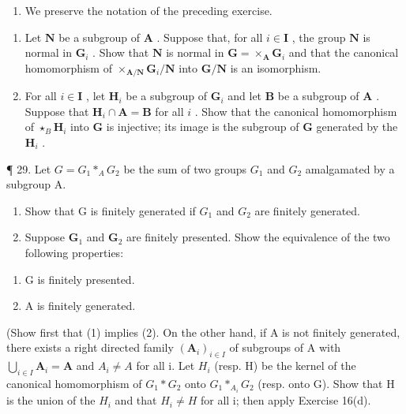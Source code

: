 \begin{enumerate}
\def\labelenumi{\arabic{enumi}.}
\setcounter{enumi}{27}
\tightlist
\item
  We preserve the notation of the preceding exercise.
\end{enumerate}

\begin{enumerate}
\def\labelenumi{(\alph{enumi})}
\item
  Let \(\mathbf{N}\) be a subgroup of \(\mathbf{A}\) . Suppose that, for all \(i \in \mathbf{I}\) , the group \(\mathbf{N}\) is normal in \(\mathbf{G}_i\) . Show that \(\mathbf{N}\) is normal in \(\mathbf{G} = \times_{\mathbf{A}} \mathbf{G}_i\) and that the canonical homomorphism of \(\times_{\mathbf{A/N}} \mathbf{G}_i / \mathbf{N}\) into \(\mathbf{G}/\mathbf{N}\) is an isomorphism.
\item
  For all \(i \in \mathbf{I}\) , let \(\mathbf{H}_i\) be a subgroup of \(\mathbf{G}_i\) and let \(\mathbf{B}\) be a subgroup of \(\mathbf{A}\) . Suppose that \(\mathbf{H}_i \cap \mathbf{A} = \mathbf{B}\) for all \(i\) . Show that the canonical homomorphism of \(\star_B \mathbf{H}_i\) into \(\mathbf{G}\) is injective; its image is the subgroup of \(\mathbf{G}\) generated by the \(\mathbf{H}_i\) .
\end{enumerate}

¶ 29. Let \(G = G_1 *_A G_2\) be the sum of two groups \(G_1\) and \(G_2\) amalgamated by a subgroup A.

\begin{enumerate}
\def\labelenumi{(\alph{enumi})}
\item
  Show that G is finitely generated if \(G_{1}\) and \(G_{2}\) are finitely generated.
\item
  Suppose \(\mathbf{G}_1\) and \(\mathbf{G}_2\) are finitely presented. Show the equivalence of the two following properties:
\end{enumerate}

\begin{enumerate}
\def\labelenumi{(\arabic{enumi})}
\item
  G is finitely presented.
\item
  A is finitely generated.
\end{enumerate}

(Show first that (1) implies (2). On the other hand, if A is not finitely generated, there exists a right directed family \((\mathbf{A}_{i})_{i\in I}\) of subgroups of A with \(\bigcup_{i\in I}\mathbf{A}_{i}=\mathbf{A}\) and \(A_{i}\neq A\) for all i. Let \(H_{i}\) (resp. H) be the kernel of the canonical homomorphism of \(G_{1}*G_{2}\) onto \(G_{1}*_{A_{i}}G_{2}\) (resp. onto G). Show that H is the union of the \(H_{i}\) and that \(H_{i}\neq H\) for all i; then apply Exercise 16(d).

